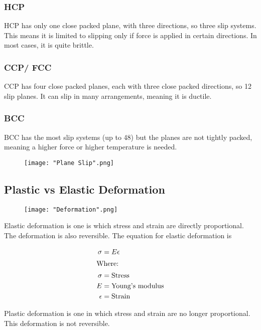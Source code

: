\documentclass[a4paper, 12pt]{article}
\begin{document}
			\subsubsection*{HCP}
				HCP has only one close packed plane, with three directions, so three slip systems. This means it is limited to slipping only if force is applied in certain directions. In most cases, it is quite brittle. 
			
			\subsubsection*{CCP/ FCC}
				CCP has four close packed planes, each with three close packed directions, so 12 slip planes. It can slip in many arrangements, meaning it is ductile. 
				
			\subsubsection*{BCC}
				BCC has the most slip systems (up to 48) but the planes are not tightly packed, meaning a higher force or higher temperature is needed. 
				\begin{figure}[!h]
					\texttt{[image: "Plane Slip".png]}
				\end{figure}

		\subsection{Plastic vs Elastic Deformation}
		
			\begin{figure}[!ht]
				\texttt{[image: "Deformation".png]}
			\end{figure}
			
			Elastic deformation is one is which stress and strain are directly proportional. The deformation is also reversible. The equation for elastic deformation is 
			
			\begin{align*}
				\sigma &= E \epsilon \\			
				\intertext{Where:} 			
			 	\sigma &= \text{Stress} \\
				E &= \text{Young's modulus} \\
				\epsilon &= \text{Strain} \\
			\end{align*}
			
			Plastic deformation is one in which stress and strain are no longer proportional. This deformation is not reversible.
			
\end{document}
